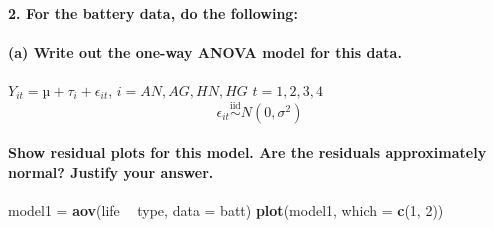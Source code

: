 \documentclass[
]{article}
\newenvironment{Shaded}{\begin{snugshade}}{\end{snugshade}}
\newcommand{\DataTypeTok}[1]{\textcolor[rgb]{0.13,0.29,0.53}{#1}}
\newcommand{\DecValTok}[1]{\textcolor[rgb]{0.00,0.00,0.81}{#1}}
\newcommand{\KeywordTok}[1]{\textcolor[rgb]{0.13,0.29,0.53}{\textbf{#1}}}
\newcommand{\NormalTok}[1]{#1}
\newcommand{\OperatorTok}[1]{\textcolor[rgb]{0.81,0.36,0.00}{\textbf{#1}}}
\newcommand{\StringTok}[1]{\textcolor[rgb]{0.31,0.60,0.02}{#1}}
\begin{document}
\hypertarget{for-the-battery-data-do-the-following}{%
\paragraph{2. For the battery data, do the
following:}\label{for-the-battery-data-do-the-following}}

\hypertarget{a-write-out-the-one-way-anova-model-for-this-data.}{%
\paragraph{(a) Write out the one-way ANOVA model for this
data.}\label{a-write-out-the-one-way-anova-model-for-this-data.}}

\(Y_{it}=µ+τ_{i}+\epsilon_{it}\), \(i=AN,AG,HN,HG\) \(t=1,2,3,4\)
\[\epsilon_{it}\overset{\text{iid}}{\sim}N(0,\sigma^2)\]

\hypertarget{show-residual-plots-for-this-model.-are-the-residuals-approximately-normal-justify-your-answer.}{%
\paragraph{Show residual plots for this model. Are the residuals
approximately normal? Justify your
answer.}\label{show-residual-plots-for-this-model.-are-the-residuals-approximately-normal-justify-your-answer.}}

\begin{Shaded}
\begin{Highlighting}[]
\NormalTok{model1 =}\StringTok{ }\KeywordTok{aov}\NormalTok{(life }\OperatorTok{~}\StringTok{ }\NormalTok{type, }\DataTypeTok{data =}\NormalTok{ batt)}
\KeywordTok{plot}\NormalTok{(model1, }\DataTypeTok{which =} \KeywordTok{c}\NormalTok{(}\DecValTok{1}\NormalTok{, }\DecValTok{2}\NormalTok{))}
\end{Highlighting}
\end{Shaded}
\end{document}
